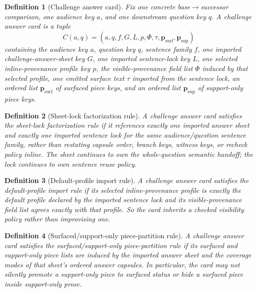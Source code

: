 \documentclass[11pt]{article}
\newtheorem{definition}{Definition}
\begin{document}
\begin{definition}[Challenge answer card]
Fix one concrete base$\to$successor comparison, one audience key $a$, and one downstream question key $q$.
A \emph{challenge answer card} is a tuple
\[
C(a,q)=(a,q,f,G,L,p,\Phi,\tau,\mathbf{p}_{\mathrm{surf}},\mathbf{p}_{\mathrm{sup}})
\]
containing the audience key $a$, question key $q$, sentence family $f$, one imported challenge-answer-sheet key $G$, one imported sentence-lock key $L$, one selected inline-provenance profile key $p$, the visible-provenance field list $\Phi$ induced by that selected profile, one emitted surface text $\tau$ imported from the sentence lock, an ordered list $\mathbf{p}_{\mathrm{surf}}$ of surfaced piece keys, and an ordered list $\mathbf{p}_{\mathrm{sup}}$ of support-only piece keys.
\end{definition}

\begin{definition}[Sheet-lock factorization rule]
A challenge answer card satisfies the \emph{sheet-lock factorization rule} if it references exactly one imported answer sheet and exactly one imported sentence lock for the same audience/question sentence family, rather than restating capsule order, branch keys, witness keys, or recheck policy inline.
The sheet continues to own the whole-question semantic handoff; the lock continues to own sentence reuse policy.
\end{definition}

\begin{definition}[Default-profile import rule]
A challenge answer card satisfies the \emph{default-profile import rule} if its selected inline-provenance profile is exactly the default profile declared by the imported sentence lock and its visible-provenance field list agrees exactly with that profile.
So the card inherits a checked visibility policy rather than improvising one.
\end{definition}

\begin{definition}[Surfaced/support-only piece-partition rule]
A challenge answer card satisfies the \emph{surfaced/support-only piece-partition rule} if its surfaced and support-only piece lists are induced by the imported answer sheet and the coverage modes of that sheet's ordered answer capsules.
In particular, the card may not silently promote a support-only piece to surfaced status or hide a surfaced piece inside support-only prose.
\end{definition}
\end{document}
